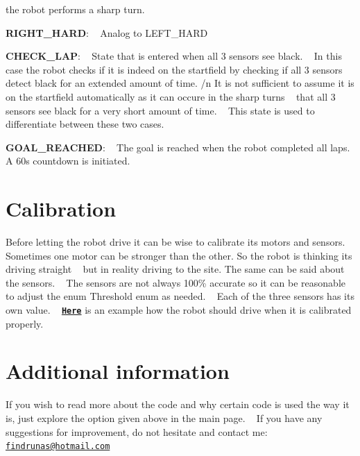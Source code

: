 \begin{DoxyItemize}
 the robot performs a sharp turn.
\item {\bfseries R\+I\+G\+H\+T\+\_\+\+H\+A\+RD}\+: ~\newline
 Analog to L\+E\+F\+T\+\_\+\+H\+A\+RD
\item {\bfseries C\+H\+E\+C\+K\+\_\+\+L\+AP}\+: ~\newline
 State that is entered when all 3 sensors see black. ~\newline
 In this case the robot checks if it is indeed on the startfield by checking if all 3 sensors detect black for an extended amount of time. /n It is not sufficient to assume it is on the startfield automatically as it can occure in the sharp turns ~\newline
 that all 3 sensors see black for a very short amount of time. ~\newline
 This state is used to differentiate between these two cases.
\item {\bfseries G\+O\+A\+L\+\_\+\+R\+E\+A\+C\+H\+ED}\+: ~\newline
 The goal is reached when the robot completed all laps. A 60s countdown is initiated.
\end{DoxyItemize}\hypertarget{index_Calibration}{}\section{Calibration}\label{index_Calibration}
Before letting the robot drive it can be wise to calibrate it\textquotesingle{}s motors and sensors. ~\newline
Sometimes one motor can be stronger than the other. So the robot is thinking its driving straight ~\newline
but in reality driving to the site. The same can be said about the sensors. ~\newline
The sensors are not always 100\% accurate so it can be reasonable to adjust the enum Threshold enum as needed. ~\newline
 Each of the three sensors has its own value. ~\newline
\href{https://youtu.be/au92yQbTNe0}{\tt {\bfseries Here}} is an example how the robot should drive when it is calibrated properly.\hypertarget{index_further_information}{}\section{Additional information}\label{index_further_information}
If you wish to read more about the code and why certain code is used the way it is, just explore the option given above in the main page. ~\newline
If you have any suggestions for improvement, do not hesitate and contact me\+: \href{mailto:findrunas@hotmail.com}{\tt findrunas@hotmail.\+com} ~\newline
